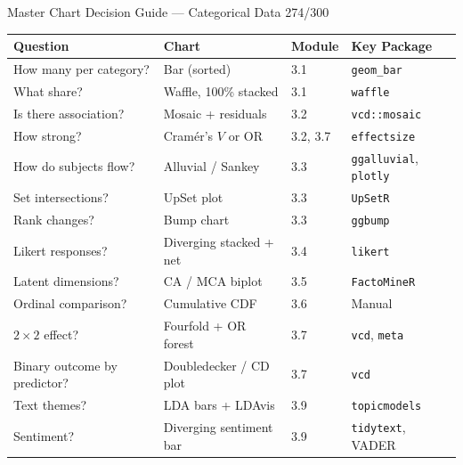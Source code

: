 \documentclass[10pt]{beamer}
\newcommand{\smark}[1]{\hfill{\scriptsize\color{codegray}#1}}
\begin{document}
\begin{frame}{Master Chart Decision Guide --- Categorical Data}
\smark{274/300}
\centering\scriptsize
\begin{tabular}{@{}llll@{}}
    \toprule
    \textbf{Question} & \textbf{Chart} & \textbf{Module} & \textbf{Key Package} \\
    \midrule
    How many per category?           & Bar (sorted)                 & 3.1 & \texttt{geom\_bar} \\
    What share?                      & Waffle, 100\% stacked        & 3.1 & \texttt{waffle} \\
    Is there association?            & Mosaic + residuals            & 3.2 & \texttt{vcd::mosaic} \\
    How strong?                      & Cram\'er's $V$ or OR          & 3.2, 3.7 & \texttt{effectsize} \\
    How do subjects flow?            & Alluvial / Sankey             & 3.3 & \texttt{ggalluvial}, \texttt{plotly} \\
    Set intersections?               & UpSet plot                    & 3.3 & \texttt{UpSetR} \\
    Rank changes?                    & Bump chart                    & 3.3 & \texttt{ggbump} \\
    Likert responses?                & Diverging stacked + net       & 3.4 & \texttt{likert} \\
    Latent dimensions?               & CA / MCA biplot               & 3.5 & \texttt{FactoMineR} \\
    Ordinal comparison?              & Cumulative CDF                & 3.6 & Manual \\
    $2 \times 2$ effect?             & Fourfold + OR forest          & 3.7 & \texttt{vcd}, \texttt{meta} \\
    Binary outcome by predictor?     & Doubledecker / CD plot        & 3.7 & \texttt{vcd} \\
    Text themes?                     & LDA bars + LDAvis             & 3.9 & \texttt{topicmodels} \\
    Sentiment?                       & Diverging sentiment bar       & 3.9 & \texttt{tidytext}, VADER \\
    \bottomrule
\end{tabular}
\end{frame}
\end{document}
